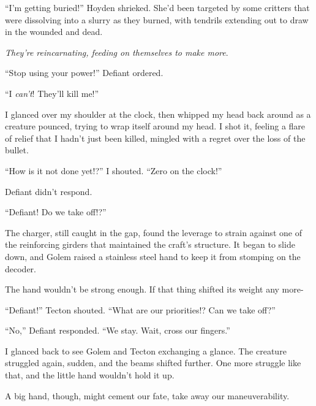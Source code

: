 ``I'm getting buried!'' Hoyden shrieked.  She'd been targeted by some critters that were dissolving into a slurry as they burned, with tendrils extending out to draw in the wounded and dead.



\emph{They're reincarnating, feeding on themselves to make more}.



``Stop using your power!'' Defiant ordered.



``I \emph{can't}!  They'll kill me!''



I glanced over my shoulder at the clock, then whipped my head back around as a creature pounced, trying to wrap itself around my head.  I shot it, feeling a flare of relief that I hadn't just been killed, mingled with a regret over the loss of the bullet.



``How is it not done yet!?'' I shouted.  ``Zero on the clock!''



Defiant didn't respond.



``Defiant!  Do we take off!?''



The charger, still caught in the gap, found the leverage to strain against one of the reinforcing girders that maintained the craft's structure.  It began to slide down, and Golem raised a stainless steel hand to keep it from stomping on the decoder.



The hand wouldn't be strong enough.  If that thing shifted its weight any more-



``Defiant!'' Tecton shouted.  ``What are our priorities!?  Can we take off?''



``No,'' Defiant responded.  ``We stay.  Wait, cross our fingers.''



I glanced back to see Golem and Tecton exchanging a glance.  The creature struggled again, sudden, and the beams shifted further.  One more struggle like that, and the little hand wouldn't hold it up.



A big hand, though, might cement our fate, take away our maneuverability.



